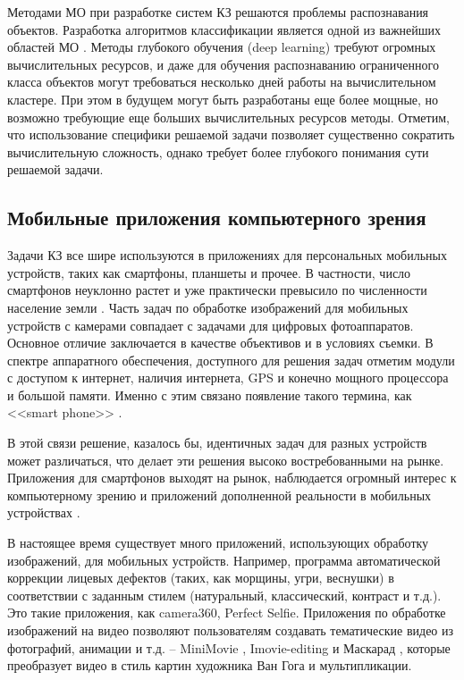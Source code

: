 Методами МО при разработке систем КЗ решаются проблемы распознавания объектов. Разработка алгоритмов классификации является одной из важнейших областей МО \cite{Murino2000}. Методы глубокого обучения (deep learning) \cite{Bengio2013} требуют огромных вычислительных ресурсов, и даже для обучения распознаванию ограниченного класса объектов могут требоваться несколько дней работы на вычислительном кластере. При этом в будущем могут быть разработаны еще более мощные, но возможно требующие еще больших вычислительных ресурсов методы.  Отметим, что использование специфики решаемой задачи позволяет существенно сократить вычислительную сложность, однако требует более глубокого понимания сути решаемой задачи.  


\subsection{Мобильные приложения компьютерного зрения}

Задачи КЗ все шире используются в приложениях для персональных мобильных устройств, таких как смартфоны, планшеты и прочее. В частности, число смартфонов неуклонно растет и уже практически превысило по численности население земли \cite{Battiato2012}. Часть задач по обработке изображений для мобильных устройств с камерами совпадает с задачами для цифровых фотоаппаратов. Основное отличие заключается в качестве объективов и в условиях съемки. В спектре аппаратного обеспечения, доступного для решения задач отметим модули с доступом к интернет, наличия интернета, GPS и конечно мощного процессора и большой памяти. Именно с этим связано появление такого термина, как <<smart phone>> \cite{Hannuksela2007}.

В этой связи решение, казалось бы, идентичных задач для разных устройств может различаться, что делает эти решения высоко востребованными на рынке. Приложения для смартфонов выходят на рынок, наблюдается огромный интерес к компьютерному зрению и приложений дополненной реальности в мобильных устройствах \cite{Shubina2010}.

В настоящее время существует много приложений, использующих обработку изображений, для мобильных устройств. Например, программа автоматической коррекции лицевых дефектов (таких, как морщины, угри, веснушки) в соответствии с заданным стилем (натуральный, классический, контраст и т.д.). Это такие приложения, как camera360, Perfect Selfie. Приложения по обработке изображений на видео позволяют пользователям создавать тематические видео из фотографий, анимации и т.д. -- MiniMovie \cite{Mini}, Imovie-editing \cite{Videoedit} и Маскарад \cite{2016}, которые преобразует видео в стиль картин художника Ван Гога и мультипликации.

